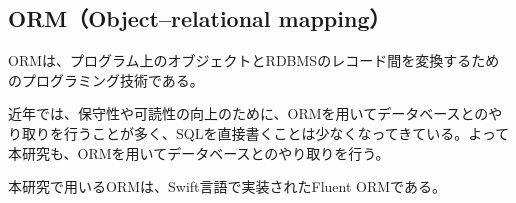 \documentclass[../../../main]{subfiles}
\begin{document}
    \subsection{ORM（Object–relational mapping）}\label{subsec:phraseology-orm}

    ORMは、プログラム上のオブジェクトとRDBMSのレコード間を変換するためのプログラミング技術である。\cite{ORM}

    近年では、保守性や可読性の向上のために、ORMを用いてデータベースとのやり取りを行うことが多く、SQLを直接書くことは少なくなってきている。よって本研究も、ORMを用いてデータベースとのやり取りを行う。

    本研究で用いるORMは、Swift言語で実装されたFluent ORMである。
\end{document}
